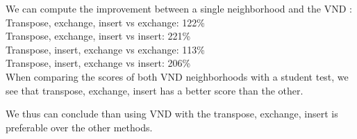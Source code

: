 \documentclass[a4paper]{article}
\begin{document}
We can compute the improvement between a single neighborhood and the VND : \\
Transpose, exchange, insert vs exchange: 122\% \\
Transpose, exchange, insert vs insert: 221\%   \\
Transpose, insert, exchange vs exchange: 113\% \\
Transpose, insert, exchange vs insert: 206\%   \\

When comparing the scores of both VND neighborhoods with a student test, we see that
transpose, exchange, insert has a better score than the other.

We thus can conclude than using VND with the transpose, exchange, insert is preferable over the other methods.



\end{document}
